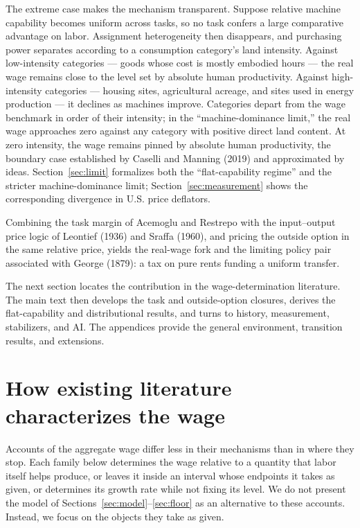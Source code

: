 \documentclass[12pt]{article}
\theoremstyle{plain}
\begin{document}
The extreme case makes the mechanism transparent. Suppose relative machine capability becomes uniform across tasks, so no task confers a large comparative advantage on labor. Assignment heterogeneity then disappears, and purchasing power separates according to a consumption category's land intensity. Against low-intensity categories --- goods whose cost is mostly embodied hours --- the real wage remains close to the level set by absolute human productivity. Against high-intensity categories --- housing sites, agricultural acreage, and sites used in energy production --- it declines as machines improve. Categories depart from the wage benchmark in order of their intensity; in the ``machine-dominance limit,'' the real wage approaches zero against any category with positive direct land content. At zero intensity, the wage remains pinned by absolute human productivity, the boundary case established by Caselli and Manning (2019) and approximated by ideas. Section~\ref{sec:limit} formalizes both the ``flat-capability regime'' and the stricter machine-dominance limit; Section~\ref{sec:measurement} shows the corresponding divergence in U.S. price deflators.

Combining the task margin of Acemoglu and Restrepo with the input--output price logic of Leontief (1936) and Sraffa (1960), and pricing the outside option in the same relative price, yields the real-wage fork and the limiting policy pair associated with George (1879): a tax on pure rents funding a uniform transfer.

The next section locates the contribution in the wage-determination
literature. The main text then develops the task and outside-option closures,
derives the flat-capability and distributional results, and turns to history,
measurement, stabilizers, and AI. The appendices provide the general
environment, transition results, and extensions.

\section{How existing literature characterizes the wage}\label{sec:accounts}

Accounts of the aggregate wage differ less in their mechanisms than in where they stop. Each family below determines the wage relative to a quantity that labor itself helps produce, or leaves it inside an interval whose endpoints it takes as given, or determines its growth rate while not fixing its level. We do not present the model of Sections~\ref{sec:model}--\ref{sec:floor} as an alternative to these accounts. Instead, we focus on the objects they take as given.
\end{document}
